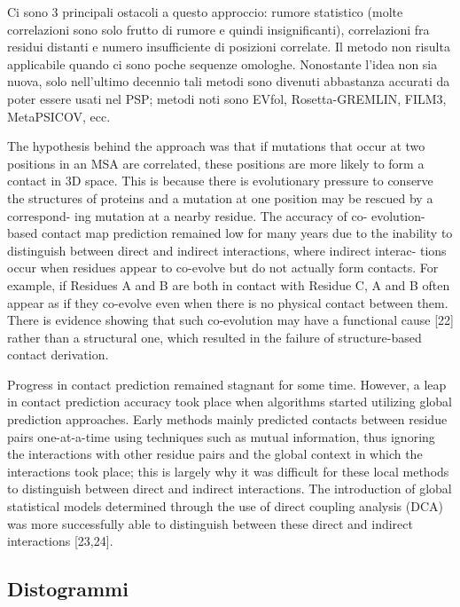 {	\par Ci sono 3 principali ostacoli a questo approccio: rumore statistico (molte correlazioni sono solo frutto di rumore e quindi insignificanti), correlazioni fra residui distanti e numero insufficiente di posizioni correlate. Il metodo non risulta applicabile quando ci sono poche sequenze omologhe. Nonostante l'idea non sia nuova, solo nell'ultimo decennio tali metodi sono divenuti abbastanza accurati da poter essere usati nel PSP; metodi noti sono EVfol, Rosetta-GREMLIN, FILM3, MetaPSICOV, ecc.
	
}

The hypothesis behind the approach was that if
mutations that occur at two positions in an MSA are
correlated, these positions are more likely to form a
contact in 3D space. This is because there is evolutionary
pressure to conserve the structures of proteins and a
mutation at one position may be rescued by a correspond-
ing mutation at a nearby residue. The accuracy of co-
evolution-based contact map prediction remained low for
many years due to the inability to distinguish between
direct and indirect interactions, where indirect interac-
tions occur when residues appear to co-evolve but do not
actually form contacts. For example, if Residues A and B
are both in contact with Residue C, A and B often appear
as if they co-evolve even when there is no physical
contact between them. There is evidence showing that
such co-evolution may have a functional cause [22] rather
than a structural one, which resulted in the failure of
structure-based contact derivation.\supercite{pearce2021deep}

Progress in contact prediction remained stagnant for some
time. However, a leap in contact prediction accuracy took
place when algorithms started utilizing global prediction
approaches. Early methods mainly predicted contacts
between residue pairs one-at-a-time using techniques
such as mutual information, thus ignoring the interactions
with other residue pairs and the global context in which
the interactions took place; this is largely why it was
difficult for these local methods to distinguish between
direct and indirect interactions. The introduction of
global statistical models determined through the use of
direct coupling analysis (DCA) was more successfully
able to distinguish between these direct and indirect
interactions [23,24]. 


\subsection{Distogrammi}


